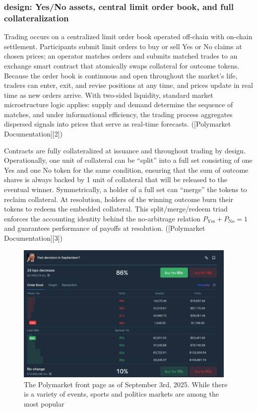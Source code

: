 \subsubsection{design: Yes/No assets, central limit order book, and full collateralization}


Trading occurs on a centralized limit order book operated off-chain with on-chain settlement. Participants submit limit orders to buy or sell Yes or No claims at chosen prices; an operator matches orders and submits matched trades to an exchange smart contract that atomically swaps collateral for outcome tokens. Because the order book is continuous and open throughout the market’s life, traders can enter, exit, and revise positions at any time, and prices update in real time as new orders arrive. With two-sided liquidity, standard market microstructure logic applies: supply and demand determine the sequence of matches, and under informational efficiency, the trading process aggregates dispersed signals into prices that serve as real-time forecasts. ([Polymarket Documentation][2])

Contracts are fully collateralized at issuance and throughout trading by design. Operationally, one unit of collateral can be “split” into a full set consisting of one Yes and one No token for the same condition, ensuring that the sum of outcome shares is always backed by 1 unit of collateral that will be released to the eventual winner. Symmetrically, a holder of a full set can “merge” the tokens to reclaim collateral. At resolution, holders of the winning outcome burn their tokens to redeem the embedded collateral. This split/merge/redeem triad enforces the accounting identity behind the no-arbitrage relation $P_{\text{Yes}} + P_{\text{No}} = 1$ and guarantees performance of payoffs at resolution. ([Polymarket Documentation][3])


\begin{figure}[H]
  \begin{center}
    \includegraphics[width=0.95\textwidth]{figures/polymarket_continuous_double_auction.png}
  \end{center}
  \caption{The Polymarket front page as of September 3rd, 2025. While there is a variety of events, sports and politics markets are among the most popular}
\end{figure}

